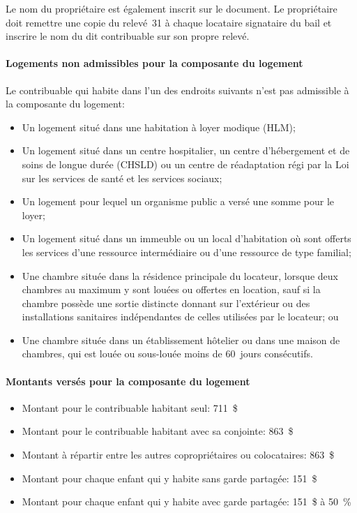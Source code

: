 Le nom du propriétaire est également inscrit sur le document. Le propriétaire doit remettre une copie du relevé~31 à chaque locataire signataire du bail et inscrire le nom du dit contribuable sur son propre relevé.

\paragraph{Logements non admissibles pour la composante du logement}
Le contribuable qui habite dans l'un des endroits suivants n'est pas admissible à la composante du logement:
\begin{itemize}[label=]
	\item Un logement situé dans une habitation à loyer modique (HLM);
	\item Un logement situé dans un centre hospitalier, un centre d'hébergement et de soins de longue durée (CHSLD) ou un centre de réadaptation régi par la Loi sur les services de santé et les services sociaux;
	\item Un logement pour lequel un organisme public a versé une somme pour le loyer;
	\item Un logement situé dans un immeuble ou un local d'habitation où sont offerts les services d'une ressource intermédiaire ou d'une ressource de type familial;
	\item Une chambre située dans la résidence principale du locateur, lorsque deux chambres au maximum y sont louées ou offertes en location, sauf si la chambre possède une sortie distincte donnant sur l'extérieur ou des installations sanitaires indépendantes de celles utilisées par le locateur; ou
	\item Une chambre située dans un établissement hôtelier ou dans une maison de chambres, qui est louée ou sous-louée moins de 60~jours consécutifs.
\end{itemize}

\paragraph{Montants versés pour la composante du logement}
\begin{itemize}
	\item Montant pour le contribuable habitant seul: 711~\$ 	
	\item Montant pour le contribuable habitant avec sa conjointe: 863~\$
	\item Montant à répartir entre les autres copropriétaires ou colocataires: 863~\$
	\item Montant pour chaque enfant qui y habite sans garde partagée: 151~\$
	\item Montant pour chaque enfant qui y habite avec garde partagée: 151~\$ à 50~\%
\end{itemize}

